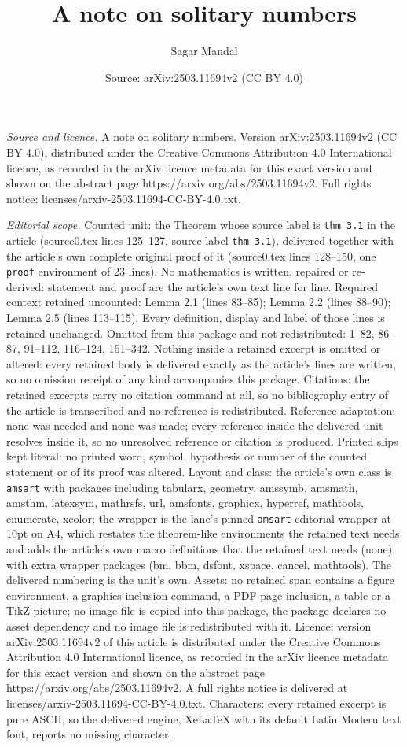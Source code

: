 \documentclass[10pt,a4paper]{amsart}
\title[A note on solitary numbers]{A note on solitary numbers}
\author{Sagar Mandal}
\date{Source: arXiv:2503.11694v2 (CC BY 4.0)}
\begin{document}
\maketitle

\noindent\emph{Source and licence.} A note on solitary numbers. Version arXiv:2503.11694v2 (CC BY 4.0), distributed under the Creative Commons Attribution 4.0 International licence, as recorded in the arXiv licence metadata for this exact version and shown on the abstract page https://arxiv.org/abs/2503.11694v2. Full rights notice: licenses/arxiv-2503.11694-CC-BY-4.0.txt.\par\smallskip

\noindent\textit{Editorial scope.} Counted unit: the Theorem whose source label is \texttt{thm 3.1} in the article (source0.tex lines 125--127, source label \texttt{thm 3.1}), delivered together with the article's own complete original proof of it (source0.tex lines 128--150, one \texttt{proof} environment of 23 lines). No mathematics is written, repaired or re-derived: statement and proof are the article's own text line for line. Required context retained uncounted: Lemma 2.1 (lines 83--85); Lemma 2.2 (lines 88--90); Lemma 2.5 (lines 113--115). Every definition, display and label of those lines is retained unchanged. Omitted from this package and not redistributed: 1--82, 86--87, 91--112, 116--124, 151--342. Nothing inside a retained excerpt is omitted or altered: every retained body is delivered exactly as the article's lines are written, so no omission receipt of any kind accompanies this package. Citations: the retained excerpts carry no citation command at all, so no bibliography entry of the article is transcribed and no reference is redistributed. Reference adaptation: none was needed and none was made; every reference inside the delivered unit resolves inside it, so no unresolved reference or citation is produced. Printed slips kept literal: no printed word, symbol, hypothesis or number of the counted statement or of its proof was altered. Layout and class: the article's own class is \texttt{amsart} with packages including tabularx, geometry, amssymb, amsmath, amsthm, latexsym, mathrsfs, url, amsfonts, graphicx, hyperref, mathtools, enumerate, xcolor; the wrapper is the lane's pinned \texttt{amsart} editorial wrapper at 10pt on A4, which restates the theorem-like environments the retained text needs and adds the article's own macro definitions that the retained text needs (none), with extra wrapper packages (bm, bbm, dsfont, xspace, cancel, mathtools). The delivered numbering is the unit's own. Assets: no retained span contains a figure environment, a graphics-inclusion command, a PDF-page inclusion, a table or a TikZ picture; no image file is copied into this package, the package declares no asset dependency and no image file is redistributed with it. Licence: version arXiv:2503.11694v2 of this article is distributed under the Creative Commons Attribution 4.0 International licence, as recorded in the arXiv licence metadata for this exact version and shown on the abstract page https://arxiv.org/abs/2503.11694v2. A full rights notice is delivered at licenses/arxiv-2503.11694-CC-BY-4.0.txt. Characters: every retained excerpt is pure ASCII, so the delivered engine, XeLaTeX with its default Latin Modern text font, reports no missing character.
\end{document}
